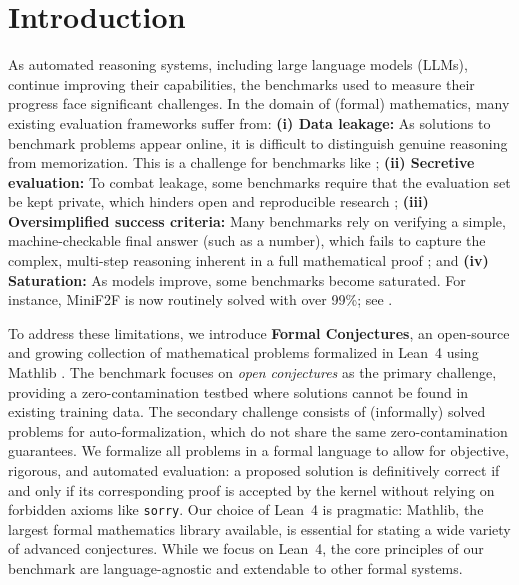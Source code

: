 \section{Introduction}\label{sec:introduction}


As automated reasoning systems, including large language models (LLMs), continue improving their capabilities, the benchmarks used to measure their progress face significant challenges.
In the domain of (formal) mathematics, many existing evaluation frameworks suffer from: \textbf{(i) Data leakage:} As solutions to benchmark problems appear online, it is difficult to distinguish genuine reasoning from memorization. This is a challenge for benchmarks like \cite{minif2f21, putnambench24, jiang2025fate, yu2025formalmath}; \textbf{(ii) Secretive evaluation:} To combat leakage, some benchmarks require that the evaluation set be kept private, which hinders open and reproducible research \citep{ARC24, frontiermath24, humanitysexam25}; \textbf{(iii) Oversimplified success criteria:} Many benchmarks rely on verifying a simple, machine-checkable final answer (such as a number), which fails to capture the complex, multi-step reasoning inherent in a full mathematical proof \citep{hendrycks2measuring, frontiermath24}; and \textbf{(iv) Saturation:} As models improve, some benchmarks become saturated. For instance, MiniF2F \citep{minif2f21} is now routinely solved with over 99\%; see \cite{AlphaProof25, chen2025seed, lin2025goedelproverv2}.


To address these limitations, we introduce \textbf{Formal Conjectures}, an open-source and growing collection of mathematical problems formalized in Lean~4 \citep{moura2021lean} using Mathlib \citep{mathlib2020}.
The benchmark focuses on \emph{open conjectures} as the primary challenge, providing a zero-contamination testbed where solutions cannot be found in existing training data.
The secondary challenge consists of (informally) solved problems for auto-formalization, which do not share the same zero-contamination guarantees.
We formalize all problems in a formal language to allow for objective, rigorous, and automated evaluation: a proposed solution is definitively correct if and only if its corresponding proof is accepted by the kernel without relying on forbidden axioms like \lstinline{sorry}.
Our choice of Lean~4 is pragmatic: Mathlib, the largest formal mathematics library available, is essential for stating a wide variety of advanced conjectures.
While we focus on Lean~4, the core principles of our benchmark are language-agnostic and extendable to other formal systems. %


